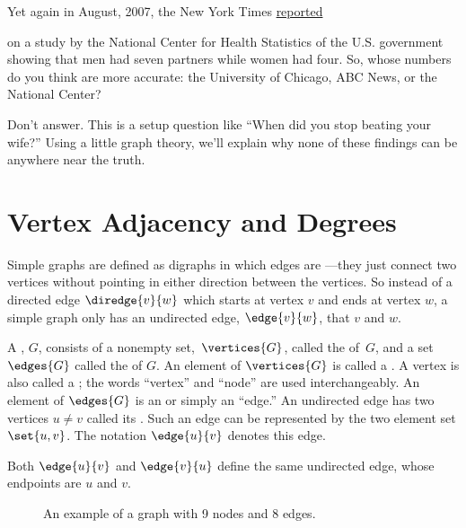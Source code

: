 Yet again in August, 2007, the New York Times
\href{The-Myth-the-Math-the-Sex.pdf}{reported}
\iffalse
\href{http://www.nytimes.com/2007/08/12/weekinreview/12kolata.html?_r=1&n=Top/Reference/Times\%20Topics/People/K/Kolata,\%20Gina&oref=slogin}{reported}
\fi
on a study by the National Center for Health Statistics of the U.S. government
showing that men had seven partners while women had four.  So, whose numbers do
you think are more accurate: the University of Chicago, ABC News, or the National
Center?  

Don't answer.  This is a setup question like ``When did you stop beating
your wife?''  Using a little graph theory, we'll explain why none of these findings
can be anywhere near the truth.

\section{Vertex Adjacency and Degrees}\label{degreessec}

Simple graphs are defined as digraphs in which edges are
---they just connect two vertices without pointing
in either direction between the vertices.  So instead of a directed
edge $\diredge{v}{w}$ which starts at vertex $v$ and ends at vertex
$w$, a simple graph only has an undirected edge, $\edge{v}{w}$, that
 $v$ and $w$.

\begin{definition}\label{simplegraphdef}
  A , $G$, consists of a nonempty
  set,~$\vertices{G}$, called the  of~$G$, and a set
  $\edges{G}$ called the  of $G$.  An element of
  $\vertices{G}$ is called a .  A vertex is also called a
  ; the words ``vertex'' and ``node'' are used
  interchangeably.  An element of $\edges{G}$ is an  or simply an ``edge.''  An undirected edge has two vertices
  $u\neq v$ called its .  Such an edge can be
  represented by the two element set $\set{u,v}$.  The notation
  $\edge{u}{v}$ denotes this edge.
\end{definition}
Both $\edge{u}{v}$ and $\edge{v}{u}$ define the same undirected edge,
whose endpoints are $u$ and $v$.

\begin{figure}[h]


\caption{An example of a graph with 9 nodes and 8 edges.}

\label{fig:graph-example}

\end{figure}

